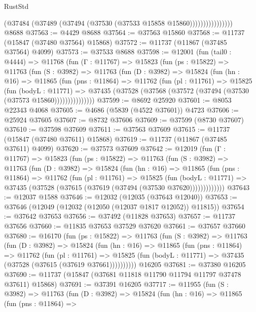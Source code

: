 \begin{lexlean}{RustStd}
\begin{coremodule}
                          (@37484 (@37489 (@37494 (@37530 (@37533 @15858 @15860))))))))))))))))
    @8688
@37563 := @4429 @8688
@37564 := @37563 @15860
@37568 := @11737 (@15847 (@37480 @37564) @15868)
@37572 := @11737 (@11867 (@37485 @37564) @4099)
@37573 := @37533 @8688
@37598 := @12001
    (fun (tail0 : @4444) =>
    @11768
      (fun (Γ : @11767) =>
      @15823
        (fun (ps : @15822) =>
        @11763
          (fun (S : @3982) =>
          @11763
            (fun (D : @3982) =>
            @15824
              (fun (hn : @16) =>
              @11865
                (fun (pns : @11864) =>
                @11762
                  (fun (pl : @11761) =>
                  @15825
                    (fun (bodyL : @11771) =>
                    @37435 (@37528 (@37568 (@37572 (@37494 (@37530 (@37573 @15860)))))))))))))))
@37599 := @8692 @25920
@37601 := @8053 @22343 @4068
@37605 := @4686 (@5839 (@4522 @37601)) @4723
@37606 := @25924 @37605
@37607 := @8732 @37606
@37609 := @37599 (@8730 @37607)
@37610 := @37598 @37609
@37611 := @37563 @37609
@37615 := @11737 (@15847 (@37480 @37611) @15868)
@37619 := @11737 (@11867 (@37485 @37611) @4099)
@37620 := @37573 @37609
@37642 := @12019
    (fun (Γ : @11767) =>
    @15823
      (fun (ps : @15822) =>
      @11763
        (fun (S : @3982) =>
        @11763
          (fun (D : @3982) =>
          @15824
            (fun (hn : @16) =>
            @11865
              (fun (pns : @11864) =>
              @11762
                (fun (pl : @11761) =>
                @15825
                  (fun (bodyL : @11771) =>
                  @37435 (@37528 (@37615 (@37619 (@37494 (@37530 @37620)))))))))))))
@37643 := @12037 @1588
@37646 := @12032 (@12035 (@37643 @12040))
@37653 := @37646 (@12049 (@12032 (@12050 (@12037 @1817 @12052)) @11815))
@37654 := @37642 @37653
@37656 := @37492 (@11828 @37653)
@37657 := @11737 @37656
@37660 := @11835 @37653 @37529 @37620
@37661 := @37657 @37660
@37680 := @16170
    (fun (ps : @15822) =>
    @11763
      (fun (S : @3982) =>
      @11763
        (fun (D : @3982) =>
        @15824
          (fun (hn : @16) =>
          @11865
            (fun (pns : @11864) =>
            @11762
              (fun (pl : @11761) =>
              @15825 (fun (bodyL : @11771) => @37435 (@37528 (@37615 (@37619 @37661))))))))))
    @16205
@37681 := @37380 @16205
@37690 := @11737 (@15847 (@37681 @11818 @11790 @11794 @11797 @37478 @37611) @15868)
@37691 := @37391 @16205
@37717 := @11955
    (fun (S : @3982) =>
    @11763
      (fun (D : @3982) =>
      @15824
        (fun (hn : @16) =>
        @11865
          (fun (pns : @11864) =>

\end{coremodule}
\end{lexlean}
